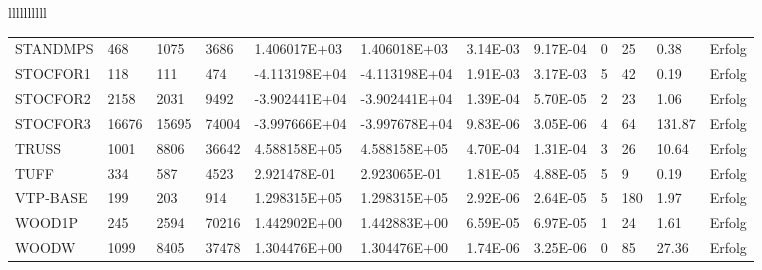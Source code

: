 \begin{tabular}{llllllllll}
\begin{tabular}{llllllllllll}
STANDMPS & 468 & 1075 & 3686 & 1.406017E+03 & 1.406018E+03 & 3.14E-03 & 9.17E-04 & 0 & 25 & 0.38 & Erfolg \\
STOCFOR1 & 118 & 111 & 474 & -4.113198E+04 & -4.113198E+04 & 1.91E-03 & 3.17E-03 & 5 & 42 & 0.19 & Erfolg \\
STOCFOR2 & 2158 & 2031 & 9492 & -3.902441E+04 & -3.902441E+04 & 1.39E-04 & 5.70E-05 & 2 & 23 & 1.06 & Erfolg \\
STOCFOR3 & 16676 & 15695 & 74004 & -3.997666E+04 & -3.997678E+04 & 9.83E-06 & 3.05E-06 & 4 & 64 & 131.87 & Erfolg \\
TRUSS & 1001 & 8806 & 36642 & 4.588158E+05 & 4.588158E+05 & 4.70E-04 & 1.31E-04 & 3 & 26 & 10.64 & Erfolg \\
TUFF & 334 & 587 & 4523 & 2.921478E-01 & 2.923065E-01 & 1.81E-05 & 4.88E-05 & 5 & 9 & 0.19 & Erfolg \\
VTP-BASE & 199 & 203 & 914 & 1.298315E+05 & 1.298315E+05 & 2.92E-06 & 2.64E-05 & 5 & 180 & 1.97 & Erfolg \\
WOOD1P & 245 & 2594 & 70216 & 1.442902E+00 & 1.442883E+00 & 6.59E-05 & 6.97E-05 & 1 & 24 & 1.61 & Erfolg \\
WOODW & 1099 & 8405 & 37478 & 1.304476E+00 & 1.304476E+00 & 1.74E-06 & 3.25E-06 & 0 & 85 & 27.36 & Erfolg \\
\bottomrule
\end{tabular}
\end{tabular}